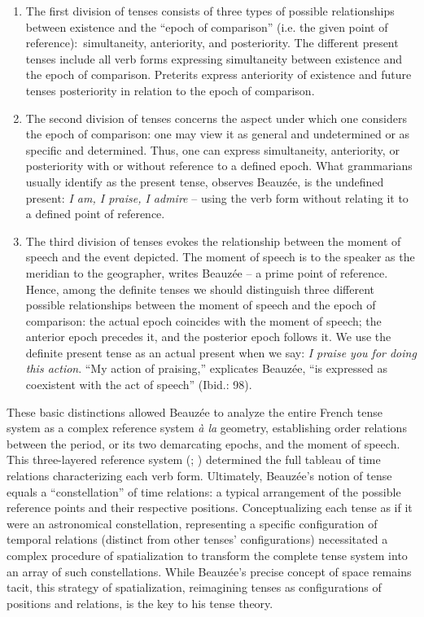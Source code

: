 \documentclass[output=paper]{langsci/langscibook}
\begin{document}
 \begin{enumerate}
 \item The first division of tenses consists of three types of possible relationships between existence and the “epoch of comparison” (i.e. the given point of reference):~simultaneity, anteriority, and posteriority. The different present tenses include all verb forms expressing simultaneity between existence and the epoch of comparison. Preterits express anteriority of existence and future tenses posteriority in relation to the epoch of comparison.
 
 \item The second division of tenses concerns the aspect under which one considers the epoch of comparison: one may view it as general and undetermined or as specific and determined. Thus, one can express simultaneity, anteriority, or posteriority with or without reference to a defined epoch. What grammarians usually identify as the present tense, observes Beauzée, is the undefined present: \textit{I am, I praise, I admire} -- using the verb form without relating it to a defined point of reference.
 
 \item The third division of tenses evokes the relationship between the moment of speech and the event depicted. The moment of speech is to the speaker as the meridian to the geographer, writes Beauzée -- a prime point of reference. Hence, among the definite tenses we should distinguish three different possible relationships between the moment of speech and the epoch of comparison: the actual epoch coincides with the moment of speech; the anterior epoch precedes it, and the posterior epoch follows it. We use the definite present tense as an actual present when we say: \textit{I praise you for doing this action}. “My action of praising,” explicates Beauzée, “is expressed as coexistent with the act of speech” (Ibid.: 98).
\end{enumerate}
 
These basic distinctions allowed Beauzée to analyze the entire French tense system as a complex reference system \textit{à la} geometry, establishing order relations between the period, or its two demarcating epochs, and the moment of speech. This three-layered reference system (\citealt{auroux_innovation_1991}; \citealt{fournier_histoire_2013}) determined the full tableau of time relations characterizing each verb form. Ultimately, Beauzée’s notion of tense equals a “constellation” of time relations: a typical arrangement of the possible reference points and their respective positions. Conceptualizing each tense as if it were an astronomical constellation, representing a specific configuration of temporal relations (distinct from other tenses’ configurations) necessitated a complex procedure of spatialization to transform the complete tense system into an array of such constellations. While Beauzée’s precise concept of space remains tacit, this strategy of spatialization, reimagining tenses as configurations of positions and relations, is the key to his tense theory.
\end{document}
